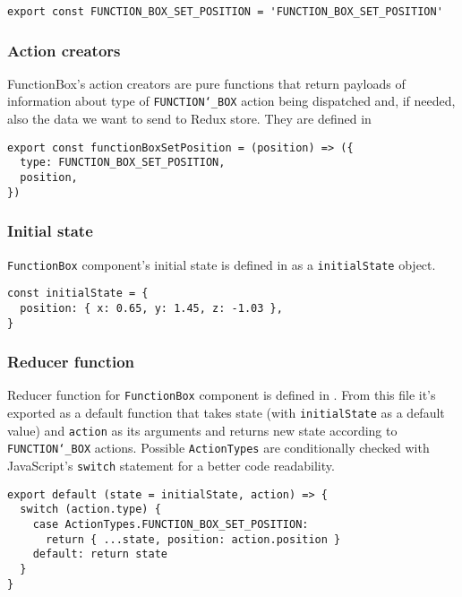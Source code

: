 \begin{lstlisting}[caption={\texttt{functionBox} action types.},captionpos=b]
export const FUNCTION_BOX_SET_POSITION = 'FUNCTION_BOX_SET_POSITION'
\end{lstlisting}

\subsubsection{Action creators}
FunctionBox's action creators are pure functions that return payloads of information about type of \texttt{FUNCTION\char`_BOX} action being dispatched and, if needed, also the data we want to send to Redux store. They are defined in 

\begin{lstlisting}[caption={Action for setting function box position.},captionpos=b]
export const functionBoxSetPosition = (position) => ({
  type: FUNCTION_BOX_SET_POSITION,
  position,
})
\end{lstlisting}

\subsubsection{Initial state}
\texttt{FunctionBox} component's initial state is defined in  as a \texttt{initialState} object.

\begin{lstlisting}[caption={Initial state of a \textsl{functionBox}.},captionpos=b]
const initialState = {
  position: { x: 0.65, y: 1.45, z: -1.03 },
}
\end{lstlisting}

\subsubsection{Reducer function}
Reducer function for \texttt{FunctionBox} component is defined in . From this file it's exported as a default function that takes state (with \texttt{initialState} as a default value) and \texttt{action} as its arguments and returns new state according to \texttt{FUNCTION\char`_BOX} actions. Possible \texttt{ActionTypes} are conditionally checked with JavaScript's \texttt{switch} statement for a better code readability.

\begin{lstlisting}[caption={Updating the   \texttt{state.functionBox.position} value.},captionpos=b]
export default (state = initialState, action) => {
  switch (action.type) {
    case ActionTypes.FUNCTION_BOX_SET_POSITION:
      return { ...state, position: action.position }
    default: return state
  }
}
\end{lstlisting}

